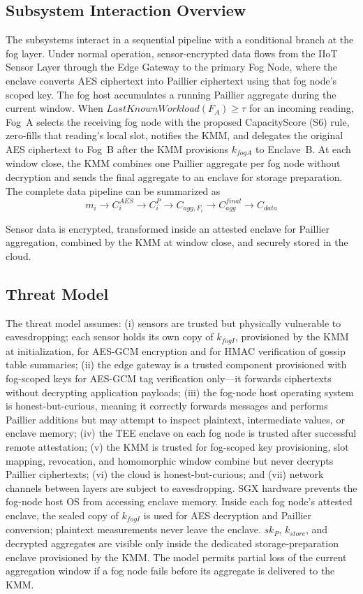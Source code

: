 \documentclass[conference]{IEEEtran}
\begin{document}
    \subsection{Subsystem Interaction Overview}
    The subsystems interact in a sequential pipeline with a conditional branch at the fog layer. Under normal operation, sensor-encrypted data flows from the IIoT Sensor Layer through the Edge Gateway to the primary Fog Node, where the enclave converts AES ciphertext into Paillier ciphertext using that fog node's scoped key. The fog host accumulates a running Paillier aggregate during the current window. When $LastKnownWorkload(F_A) \geq \tau$ for an incoming reading, Fog~A selects the receiving fog node with the proposed CapacityScore (S6) rule, zero-fills that reading's local slot, notifies the KMM, and delegates the original AES ciphertext to Fog~B after the KMM provisions $k_{fogA}$ to Enclave~B. At each window close, the KMM combines one Paillier aggregate per fog node without decryption and sends the final aggregate to an enclave for storage preparation. The complete data pipeline can be summarized as
    \begin{equation}
    m_i \rightarrow C_i^{AES} \rightarrow C_i^P \rightarrow C_{agg,F_i} \rightarrow C_{agg}^{final} \rightarrow C_{data}
    \end{equation}

    Sensor data is encrypted, transformed inside an attested enclave for Paillier aggregation, combined by the KMM at window close, and securely stored in the cloud.


    \subsection{Threat Model}
    The threat model assumes: (i) sensors are trusted but physically vulnerable to eavesdropping; each sensor holds its own copy of $k_{fogI}$, provisioned by the KMM at initialization, for AES-GCM encryption and for HMAC verification of gossip table summaries; (ii) the edge gateway is a trusted component provisioned with fog-scoped keys for AES-GCM tag verification only---it forwards ciphertexts without decrypting application payloads; (iii) the fog-node host operating system is honest-but-curious, meaning it correctly forwards messages and performs Paillier additions but may attempt to inspect plaintext, intermediate values, or enclave memory; (iv) the TEE enclave on each fog node is trusted after successful remote attestation; (v) the KMM is trusted for fog-scoped key provisioning, slot mapping, revocation, and homomorphic window combine but never decrypts Paillier ciphertexts; (vi) the cloud is honest-but-curious; and (vii) network channels between layers are subject to eavesdropping. SGX hardware prevents the fog-node host OS from accessing enclave memory. Inside each fog node's attested enclave, the sealed copy of $k_{fogI}$ is used for AES decryption and Paillier conversion; plaintext measurements never leave the enclave. $sk_P$, $k_{store}$, and decrypted aggregates are visible only inside the dedicated storage-preparation enclave provisioned by the KMM. The model permits partial loss of the current aggregation window if a fog node fails before its aggregate is delivered to the KMM.
\end{document}
